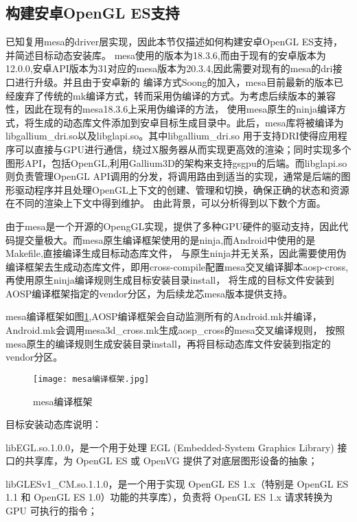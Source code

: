 \subsection{构建安卓OpenGL ES支持}

已知复用mesa的driver层实现，因此本节仅描述如何构建安卓OpenGL ES支持，并简述目标动态安装库。
mesa使用的版本为18.3.6,而由于现有的安卓版本为12.0.0,安卓API版本为31对应的mesa版本为20.3.4,因此需要对现有的mesa的dri接口进行升级。并且由于安卓新的
编译方式Soong的加入，mesa目前最新的版本已经废弃了传统的mk编译方式，转而采用伪编译的方式。为考虑后续版本的兼容性，因此在现有的mesa18.3.6上采用伪编译的方法，
使用mesa原生的ninja编译方式，将生成的动态库文件添加到安卓目标生成目录中。此后，mesa库将被编译为libgallium\_dri.so以及libglapi.so。其中libgallium\_dri.so
用于支持DRI使得应用程序可以直接与GPU进行通信，绕过X服务器从而实现更高效的渲染；同时实现多个图形API，包括OpenGL,利用Gallium3D的架构来支持gsgpu的后端。而libglapi.so
则负责管理OpenGL API调用的分发，将调用路由到适当的实现，通常是后端的图形驱动程序并且处理OpenGL上下文的创建、管理和切换，确保正确的状态和资源在不同的渲染上下文中得到维护。
由此背景，可以分析得到以下数个方面。

由于mesa是一个开源的OpengGL实现，提供了多种GPU硬件的驱动支持，因此代码提交量极大。而mesa原生编译框架使用的是ninja,而Android中使用的是Makefile,直接编译生成目标动态库文件，
与原生ninja并无关系，因此需要使用伪编译框架去生成动态库文件，即用cross-compile配置mesa交叉编译脚本aosp-cross,再使用原生ninja编译规则生成目标安装目录install，
将生成的目标文件安装到AOSP编译框架指定的vendor分区，为后续龙芯mesa版本提供支持。

mesa编译框架如图\ref{fig:mesa编译框架},AOSP编译框架会自动监测所有的Android.mk并编译，Android.mk会调用mesa3d\_cross.mk生成aosp\_cross的mesa交叉编译规则，
按照mesa原生的编译规则生成安装目录install，再将目标动态库文件安装到指定的vendor分区。
\begin{figure}[h]
  \centering
  \texttt{[image: mesa编译框架.jpg]}
  \caption{mesa编译框架}
  \label{fig:mesa编译框架}
\end{figure}

目标安装动态库说明：

libEGL.so.1.0.0，是一个用于处理 EGL (Embedded-System Graphics Library) 接口的共享库，为 OpenGL ES 或 OpenVG 提供了对底层图形设备的抽象；

libGLESv1\_CM.so.1.1.0，是一个用于实现 OpenGL ES 1.x（特别是 OpenGL ES 1.1 和 OpenGL ES 1.0）功能的共享库），负责将 OpenGL ES 1.x 请求转换为 GPU 可执行的指令；


